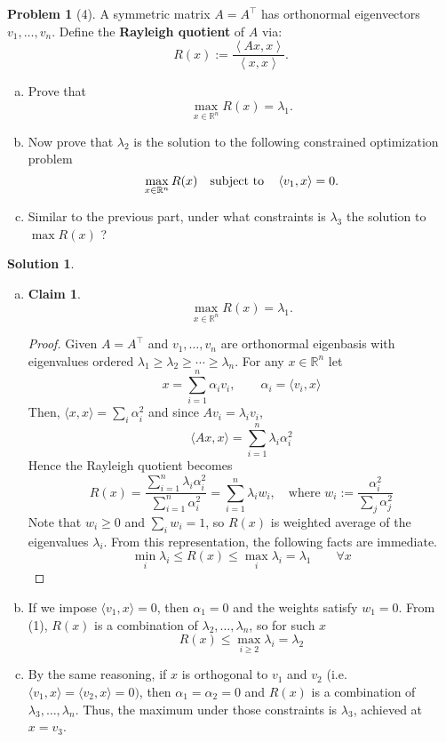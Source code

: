 \documentclass{amsart}[11pt]
\newtheorem*{claim}{Claim}
\theoremstyle{definition}
\newtheorem*{problem}{Problem}
\newtheorem*{solution}{Solution}
\newcommand{\R}{\mathbb{R}}
\newcommand{\bracket}[1]{\left\langle#1\right\rangle}
\begin{document}
\begin{problem}[4]A symmetric matrix $A=A^\top$ has orthonormal eigenvectors $v_1,\dots,v_n$. Define the \textbf{Rayleigh quotient} of $A$ via:
    \[ R(x):= \frac{\bracket{Ax,x}}{\bracket{x,x}}. \]
    
\begin{enumerate}[(a)]
    \item Prove that \[\max_{x\in\R^n} R(x) = \lambda_1.\]
    \item Now prove that $\lambda_2$ is the solution to the following constrained optimization problem
    \[ \max_{x\in\R^n} R(x) \quad \textnormal{subject to} \quad \bracket{v_1,x}=0. \]
    \item Similar to the previous part, under what constraints is $\lambda_3$ the solution to $\max R(x)$	?
\end{enumerate}
\begin{solution}
    \begin{enumerate}[(a)]
        \item \begin{claim}
            \[\max_{x\in\R^n} R(x) = \lambda_1.\]
        \end{claim}
        \begin{proof}
            Given $A=A^\top$ and $v_1,\dots,v_n$ are orthonormal eigenbasis with eigenvalues ordered $\lambda_1\ge\lambda_2\ge\cdots\ge\lambda_n$. For any $x\in\mathbb R^n$ let
\[x=\sum_{i=1}^n \alpha_i v_i,\qquad \alpha_i=\langle v_i,x\rangle\] Then, $\langle x,x\rangle=\sum_i \alpha_i^2$ and since $Av_i=\lambda_i v_i$, \[\langle Ax,x\rangle=\sum_{i=1}^n \lambda_i\alpha_i^2\] 
Hence the Rayleigh quotient becomes \[R(x)=\frac{\sum_{i=1}^n \lambda_i\alpha_i^2}{\sum_{i=1}^n \alpha_i^2}
= \sum_{i=1}^n \lambda_i w_i,
\quad\text{where } w_i:=\frac{\alpha_i^2}{\sum_j\alpha_j^2}\tag{1}\]
Note that $w_i\ge0$ and $\sum_i w_i=1$, so $R(x)$ is weighted average of the eigenvalues ${\lambda_i}$. From this representation, the following facts are immediate.
\[\min_i\lambda_i \le R(x)\le \max_i\lambda_i=\lambda_1\qquad \forall x\]
        \end{proof} 
        \item If we impose $\langle v_1,x\rangle=0$, then $\alpha_1=0$ and the weights satisfy $w_1=0$. From (1), $R(x)$ is a combination of $\lambda_2,\dots,\lambda_n$, so for such $x$
        \[R(x)\le\max_{i\ge2}\lambda_i=\lambda_2\]
        \item By the same reasoning, if $x$ is orthogonal to $v_1$ and $v_2$ (i.e. $\langle v_1,x\rangle=\langle v_2,x\rangle=0)$, then $\alpha_1=\alpha_2=0$ and $R(x)$ is a combination of $\lambda_3,\dots,\lambda_n$. Thus, the maximum under those constraints is $\lambda_3$, achieved at $x=v_3$.
    \end{enumerate}
\end{solution}
\end{problem}
\end{document}
